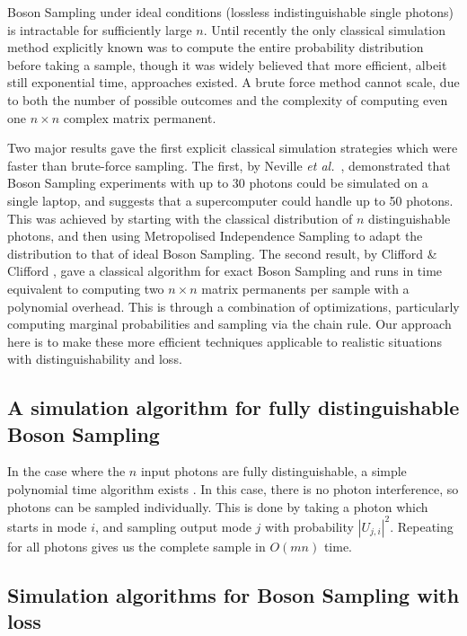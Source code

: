 Boson Sampling under ideal conditions (lossless indistinguishable single photons) is intractable for sufficiently large $n$. 
Until recently the only classical simulation method explicitly known was to compute the entire probability distribution before taking a sample, though it was widely believed that more efficient, albeit still exponential time, approaches existed. 
A brute force method cannot scale, due to both the number of possible outcomes and the complexity of computing even one $n\times n$ complex matrix permanent.

Two major results gave the first explicit classical simulation strategies which were faster than brute-force sampling. 
The first, by Neville \textit{et al.}~\cite{neville2017}, demonstrated that Boson Sampling experiments with up to 30 photons could be simulated on a single laptop, and suggests that a supercomputer could handle up to 50 photons. 
This was achieved by starting with the classical distribution of $n$ distinguishable photons, and then using Metropolised Independence Sampling to adapt the distribution to that of ideal Boson Sampling.
The second result, by Clifford \& Clifford \cite{clifford2017}, gave a classical algorithm for exact Boson Sampling and runs in time equivalent to computing two $n \times n$ matrix  permanents per sample with a polynomial overhead. 
This is through a combination of optimizations, particularly computing marginal probabilities and sampling via the chain rule.
Our approach here is to make these more efficient techniques applicable to realistic situations with distinguishability and loss.

\subsection{A simulation algorithm for fully distinguishable Boson Sampling}

In the case where the $n$ input photons are fully distinguishable, a simple polynomial time algorithm exists \cite{aaronson2014}. In this case, there is no photon interference, so photons can be sampled individually. This is done by taking a photon which starts in mode $i$, and sampling output mode $j$ with probability $|U_{j,i}|^2$. Repeating for all photons gives us the complete sample in $O(mn)$ time.

\subsection{Simulation algorithms for Boson Sampling with loss}

